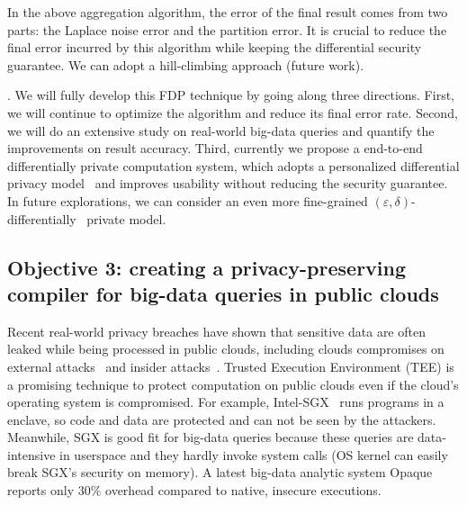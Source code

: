 In the above aggregation algorithm, the error of the final result comes from 
two parts: the Laplace noise error and the partition error. It is crucial to 
reduce the final error incurred by this algorithm while keeping the 
differential security guarantee. We can adopt a hill-climbing approach (future 
work).

. We will fully develop this FDP technique by going 
along three directions. First, we will continue to optimize the algorithm and 
reduce its final error rate. Second, we will do an extensive study on 
real-world big-data queries and quantify the improvements on result accuracy. 
Third, currently we propose a end-to-end differentially private computation
system, which adopts a personalized differential privacy 
model~\cite{pdp:icde15} and improves usability without reducing the security 
guarantee. In future explorations, we can consider an even more fine-grained 
$(\varepsilon, \delta)$-differentially~\cite{differntialprivacy:tcc06}
private model.


\vspace{-.15in}\subsection{Objective 3: creating a privacy-preserving compiler 
for big-data queries in public clouds}\label{sec:obj3}\vspace{-.075in}


Recent real-world privacy breaches have shown that sensitive data are often 
leaked while being processed in public clouds, including clouds compromises on 
external attacks~\cite{icloud-breach} and 
insider attacks~\cite{top-threats}. Trusted Execution Environment 
(TEE) is a promising technique to protect computation on public clouds even if 
the cloud's operating system is compromised. For example, 
Intel-SGX~\cite{intel-sgx} runs programs in a enclave, so code and data are 
protected and can not be seen by the attackers. Meanwhile, SGX is good fit for 
big-data queries because these queries are data-intensive in userspace and they 
hardly invoke system calls (OS kernel can easily break SGX's security on 
memory). A latest big-data analytic system Opaque~\cite{opaque:nsdi17} reports 
only 30\% overhead compared to native, insecure executions.

